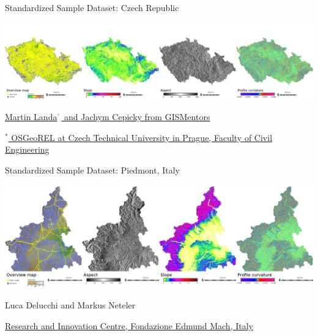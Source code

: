 \documentclass[xcolor={dvipsnames,usenames},beamer,aspectratio=169]{beamer}
\newcommand{\n}[1]{$^{\textcolor{gray}{\mbox{\tiny{#1}}}}$}
\begin{document}
\begin{frame}{Standardized Sample Dataset: Czech Republic}

\begin{center}
\includegraphics[width=\textwidth]{./images/dataset/std_dataset_cz_stripe.png}
\end{center}

\href{http://gismentors.eu/}{Martin Landa\n{*} and Jachym Cepicky from GISMentors}

\bigskip

$^*$\href{http://geomatics.fsv.cvut.cz/research/osgeorel/}%
{\scriptsize
OSGeoREL
at Czech Technical University in Prague,
Faculty of Civil Engineering
}

\end{frame}

\begin{frame}{Standardized Sample Dataset: Piedmont, Italy}

\begin{center}
\includegraphics[width=\textwidth]{./images/dataset/std_dataset_it_stripe.png}
\end{center}


Luca Delucchi and Markus Neteler

{\scriptsize
\href{http://gis.cri.fmach.it/}{Research and Innovation Centre, Fondazione Edmund Mach, Italy}
}

\end{frame}
\end{document}
